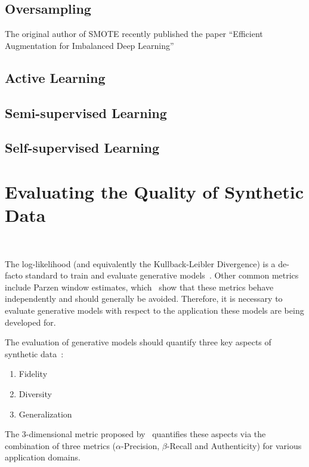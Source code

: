 \documentclass[parskip=full]{scrartcl}
\begin{document}
\subsection{Oversampling}

The original author of SMOTE recently published the paper ``Efficient Augmentation for Imbalanced Deep
Learning''~\cite{dablain2022efficient}

\subsection{Active Learning}

\subsection{Semi-supervised Learning}

\subsection{Self-supervised Learning}

\section{Evaluating the Quality of Synthetic Data
}~\label{sec:evaluating-synthetic-data}

The log-likelihood (and equivalently the Kullback-Leibler Divergence) is a
de-facto standard to train and evaluate generative
models~\cite{theis2016note}. Other common metrics include Parzen window
estimates, which~\citet{theis2016note} show that these metrics behave
independently and should generally be avoided. Therefore, it is necessary
to evaluate generative models with respect to the application these models are
being developed for.


The evaluation of generative models should quantify three key aspects of
synthetic data~\cite{alaa2022faithful}:

\begin{enumerate}
    \item Fidelity
    \item Diversity 
    \item Generalization
\end{enumerate}

The 3-dimensional metric proposed by~\citet{alaa2022faithful} quantifies these
aspects via the combination of three metrics ($\alpha$-Precision,
$\beta$-Recall and Authenticity) for various application domains.
\end{document}
